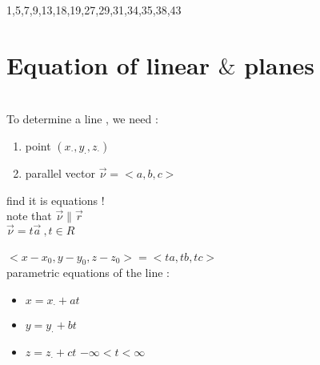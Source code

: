 \noindent{\color{smalt(darkpowderblue)}\rule{\linewidth}{.2mm}}
\begin{problem}
1,5,7,9,13,18,19,27,29,31,34,35,38,43
\end{problem}
\section{Equation of linear $\&$ planes}
{}\\
 To determine a line , we need :
 \begin{enumerate}
     \item  point $(x_\cdot , y_\cdot , z_\cdot )$
 \item parallel vector $\overrightarrow{\nu} = <a,b,c>$
 \end{enumerate}
 find it is equations ! \\
 note that $\overrightarrow{\nu} \parallel \overrightarrow{r} $\\
 $\overrightarrow{\nu} = t\overrightarrow{a} ~, t \in R $\\ {\color{smalt(darkpowderblue)}{vector equation of the line .}}\\
 $< x-x_0 , y-y_0 , z-z_0 > = < ta , tb ,tc >$\\
 parametric equations of the line :
 \begin{itemize}
     \item $x = x_\cdot + at $
\item $y = y_\cdot + bt $
\item $z = z_\cdot + ct $
 \hspace{1cm} $ -\infty < t < \infty $
  \end{itemize}
\noindent{\color{smalt(darkpowderblue)}\rule{\linewidth}{.2mm}}
